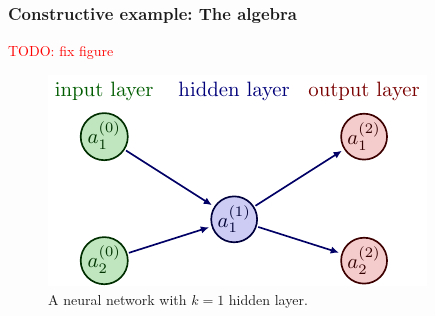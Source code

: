 \documentclass[11pt]{article}
\begin{document}
\subsubsection{Constructive example: The algebra}

\textcolor{red}{TODO: fix figure}

\begin{figure}[ht]
    \centering
    \includegraphics{./figures/neural_nets/MLP_2.pdf}
    \caption{A neural network with $k=1$ hidden layer.}
    \label{fig:neural_nets_simple_example}
\end{figure}
\end{document}
